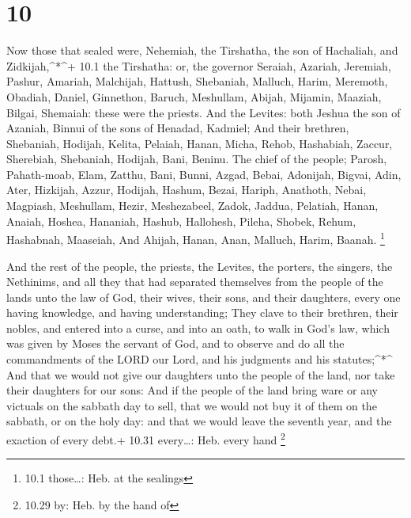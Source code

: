 \hypertarget{section-9}{%
\section{10}\label{section-9}}

 Now those that sealed were, Nehemiah, the Tirshatha, the
son of Hachaliah, and Zidkijah,\^{}*\^{}+ 10.1 the Tirshatha: or, the
governor  Seraiah, Azariah, Jeremiah,  Pashur,
Amariah, Malchijah,  Hattush, Shebaniah, Malluch,
 Harim, Meremoth, Obadiah,  Daniel, Ginnethon,
Baruch,  Meshullam, Abijah, Mijamin,  Maaziah,
Bilgai, Shemaiah: these were the priests.  And the Levites:
both Jeshua the son of Azaniah, Binnui of the sons of Henadad, Kadmiel;
 And their brethren, Shebaniah, Hodijah, Kelita, Pelaiah,
Hanan,  Micha, Rehob, Hashabiah,  Zaccur,
Sherebiah, Shebaniah,  Hodijah, Bani, Beninu. 
The chief of the people; Parosh, Pahath-moab, Elam, Zatthu, Bani,
 Bunni, Azgad, Bebai,  Adonijah, Bigvai, Adin,
 Ater, Hizkijah, Azzur,  Hodijah, Hashum,
Bezai,  Hariph, Anathoth, Nebai,  Magpiash,
Meshullam, Hezir,  Meshezabeel, Zadok, Jaddua,
 Pelatiah, Hanan, Anaiah,  Hoshea, Hananiah,
Hashub,  Hallohesh, Pileha, Shobek,  Rehum,
Hashabnah, Maaseiah,  And Ahijah, Hanan, Anan,
 Malluch, Harim, Baanah. \footnote{10.1 those\ldots: Heb.
  at the sealings}

 And the rest of the people, the priests, the Levites, the
porters, the singers, the Nethinims, and all they that had separated
themselves from the people of the lands unto the law of God, their
wives, their sons, and their daughters, every one having knowledge, and
having understanding;  They clave to their brethren, their
nobles, and entered into a curse, and into an oath, to walk in God's
law, which was given by Moses the servant of God, and to observe and do
all the commandments of the LORD our Lord, and his judgments and his
statutes;\^{}*\^{}  And that we would not give our
daughters unto the people of the land, nor take their daughters for our
sons:  And if the people of the land bring ware or any
victuals on the sabbath day to sell, that we would not buy it of them on
the sabbath, or on the holy day: and that we would leave the seventh
year, and the exaction of every debt.+ 10.31 every\ldots: Heb. every
hand \footnote{10.29 by: Heb. by the hand of}

